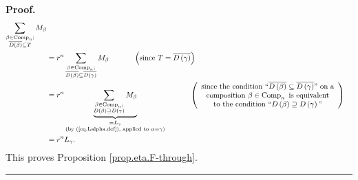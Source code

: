\documentclass[numbers=enddot,12pt,final,onecolumn,notitlepage]{scrartcl}%
\theoremstyle{definition}
\newenvironment{proof}[1][Proof]{\noindent\textbf{#1.} }{\ \rule{0.5em}{0.5em}}
\let\sumnonlimits\sum
\renewcommand{\sum}{\sumnonlimits\limits}
\newenvironment{vershort}{}{}
\begin{document}
\begin{vershort}
\begin{proof}
\begin{align*}
\sum_{\substack{\beta\in\operatorname*{Comp}\nolimits_{n};\\\overline{D\left(
\beta\right)  }\subseteq T}}M_{\beta}\\
&  =r^{n}\sum_{\substack{\beta\in\operatorname*{Comp}\nolimits_{n}%
;\\\overline{D\left(  \beta\right)  }\subseteq\overline{D\left(
\gamma\right)  }}}M_{\beta}\ \ \ \ \ \ \ \ \ \ \left(  \text{since
}T=\overline{D\left(  \gamma\right)  }\right) \\
&  =r^{n}\underbrace{\sum_{\substack{\beta\in\operatorname*{Comp}%
\nolimits_{n};\\D\left(  \beta\right)  \supseteq D\left(  \gamma\right)
}}M_{\beta}}_{\substack{=L_{\gamma}\\\text{(by (\ref{eq.Lalpha.def}), applied
to }\alpha=\gamma\text{)}}}\ \ \ \ \ \ \ \ \ \ \left(
\begin{array}
[c]{c}%
\text{since the condition \textquotedblleft}\overline{D\left(  \beta\right)
}\subseteq\overline{D\left(  \gamma\right)  }\text{\textquotedblright\ on a}\\
\text{composition }\beta\in\operatorname*{Comp}\nolimits_{n}\text{ is
equivalent}\\
\text{to the condition \textquotedblleft}D\left(  \beta\right)  \supseteq
D\left(  \gamma\right)  \text{\textquotedblright}%
\end{array}
\right) \\
&  =r^{n}L_{\gamma}.
\end{align*}
This proves Proposition \ref{prop.eta.F-through}.
\end{proof}
\end{vershort}
\end{document}
